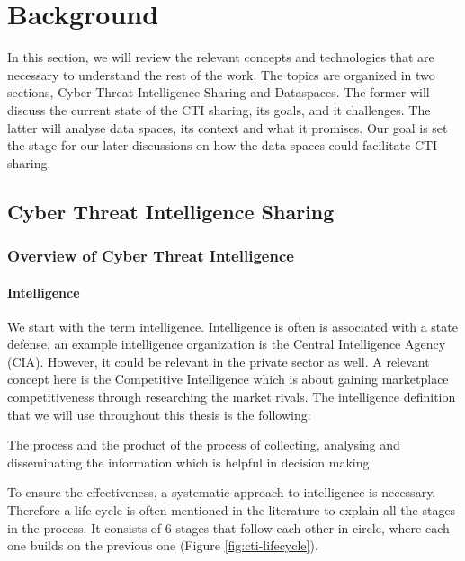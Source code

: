 \chapter{Background}
In this section, we will review the relevant concepts and technologies that are necessary to understand the rest of the work. The topics are organized in two sections, Cyber Threat Intelligence Sharing and Dataspaces. The former will discuss the current state of the CTI sharing, its goals, and it challenges. The latter will analyse data spaces, its context and what it promises. Our goal is set the stage for our later discussions on how the data spaces could facilitate CTI sharing. 

\section{Cyber Threat Intelligence Sharing}
\subsection{Overview of Cyber Threat Intelligence}

\subsubsection{Intelligence}
We start with the term intelligence. 
Intelligence is often is associated with a state defense, an example intelligence organization is the Central Intelligence Agency (CIA). 
However, it could be relevant in the private sector as well. 
A relevant concept here is the Competitive Intelligence which is about gaining marketplace competitiveness through researching the market rivals. The intelligence definition that we will use throughout this thesis is the following:

\smallskip
The process and the product of the process of collecting, analysing and disseminating the information which is helpful in decision making.

To ensure the effectiveness, a systematic approach to intelligence is necessary. Therefore a life-cycle is often mentioned in the literature to explain all the stages in the process. It consists of 6 stages that follow each other in circle, where each one builds on the previous one (Figure \ref{fig:cti-lifecycle}).


